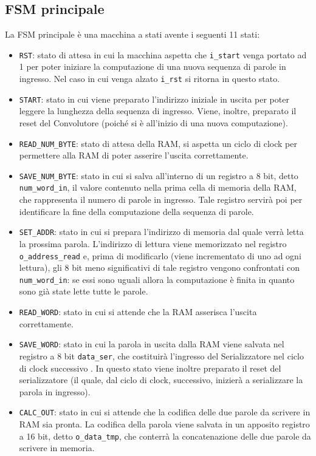 \documentclass{article}
\begin{document}
\subsection{FSM principale}
La FSM principale è una macchina a stati avente i seguenti 11 stati:
\begin{itemize}
    \item \texttt{RST}: stato di attesa in cui la macchina aspetta che \texttt{i\_start} venga portato ad 1 per poter iniziare la computazione di una nuova sequenza di parole in ingresso. Nel caso in cui venga alzato \texttt{i\_rst} si ritorna in questo stato.
    \item \texttt{START}: stato in cui viene preparato l'indirizzo iniziale in uscita per poter leggere la lunghezza della sequenza di ingresso. Viene, inoltre, preparato il reset del Convolutore (poiché si è all'inizio di una nuova computazione).
    \item \texttt{READ\_NUM\_BYTE}: stato di attesa della RAM, si aspetta un ciclo di clock per permettere alla RAM di poter asserire l'uscita correttamente.
    \item \texttt{SAVE\_NUM\_BYTE}: stato in cui si salva all'interno di un registro a 8 bit, detto \texttt{num\_word\_in}, il valore contenuto nella prima cella di memoria della RAM, che rappresenta il numero di parole in ingresso. Tale registro servirà poi per identificare la fine della computazione della sequenza di parole.
    \item \texttt{SET\_ADDR}: stato in cui si prepara l'indirizzo di memoria dal quale verrà letta la prossima parola. L'indirizzo di lettura viene memorizzato nel registro \texttt{o\_address\_read} e, prima di modificarlo (viene incrementato di uno ad ogni lettura), gli 8 bit meno significativi di tale registro vengono confrontati con \texttt{num\_word\_in}: se essi sono uguali allora la computazione è finita in quanto sono già state lette tutte le parole.
    \item \texttt{READ\_WORD}: stato in cui si attende che la RAM asserisca l'uscita correttamente.
    \item \texttt{SAVE\_WORD}: stato in cui la parola in uscita dalla RAM viene salvata nel registro a 8 bit \texttt{data\_ser}, che costituirà l'ingresso del Serializzatore nel ciclo di clock successivo . In questo stato viene inoltre preparato il reset del serializzatore (il quale, dal ciclo di clock, successivo, inizierà a serializzare la parola in ingresso). 
    \item \texttt{CALC\_OUT}: stato in cui si attende che la codifica delle due parole da scrivere in RAM sia pronta. La codifica della parola viene salvata in un apposito registro a 16 bit, detto \texttt{o\_data\_tmp}, che conterrà la concatenazione delle due parole da scrivere in memoria.

\end{itemize}
\end{document}
